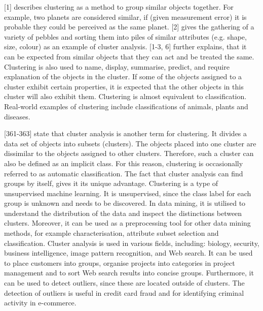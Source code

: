

\textcite{hartigan1975clustering}[1] describes clustering as a method to group similar objects together. For example, two planets are considered similar, if (given measurement error) it is probable they could be perceived as the same planet. \textcite{romesburg2004cluster}[2] gives the gathering of a variety of pebbles and sorting them into piles of similar attributes (e.g. shape, size, colour) as an example of cluster analysis. \textcite{hartigan1975clustering}[1-3, 6] further explains, that it can be expected from similar objects that they can act and be treated the same. Clustering is also used to name, display, summarise, predict, and require explanation of the objects in the cluster. If some of the objects assigned to a cluster exhibit certain properties, it is expected that the other objects in this cluster will also exhibit them. Clustering is almost equivalent to classification. Real-world examples of clustering include classifications of animals, plants and diseases.

\textcite{han2011data}[361-363] state that cluster analysis is another term for clustering. It divides a data set of objects into subsets (clusters). The objects placed into one cluster are dissimilar to the objects assigned to other clusters. Therefore, such a cluster can also be defined as an implicit class. For this reason, clustering is occasionally referred to as automatic classification. The fact that cluster analysis can find groups by itself, gives it its unique advantage. Clustering is a type of unsupervised machine learning. It is unsupervised, since the class label for each group is unknown and needs to be discovered. In data mining, it is utilised to understand the distribution of the data and inspect the distinctions between clusters. Moreover, it can be used as a preprocessing tool for other data mining methods, for example characterisation, attribute subset selection and classification.
Cluster analysis is used in various fields, including: biology, security, business intelligence, image pattern recognition, and Web search. It can be used to place customers into groups, organise projects into categories in project management and to sort Web search results into concise groups. Furthermore, it can be used to detect outliers, since these are located outside of clusters. The detection of outliers is useful in credit card fraud and for identifying criminal activity in e-commerce. 


